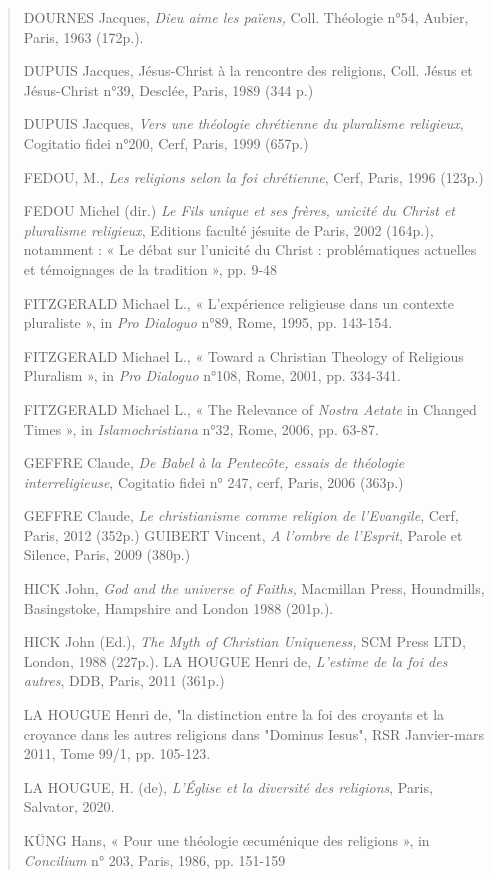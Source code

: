 \begin{quote}
DOURNES Jacques, \emph{Dieu aime les païens,} Coll. Théologie n°54,
Aubier, Paris, 1963 (172p.).

DUPUIS Jacques, Jésus-Christ à la rencontre des religions, Coll. Jésus
et Jésus-Christ n°39, Desclée, Paris, 1989 (344 p.)

DUPUIS Jacques, \emph{Vers une théologie chrétienne du pluralisme
religieux}, Cogitatio fidei n°200, Cerf, Paris, 1999 (657p.)

FEDOU, M., \emph{Les religions selon la foi chrétienne}, Cerf, Paris,
1996 (123p.)

FEDOU Michel (dir.) \emph{Le Fils unique et ses frères, unicité du
Christ et pluralisme religieux}, Editions faculté jésuite de Paris, 2002
(164p.), notamment : « Le débat sur l'unicité du Christ : problématiques
actuelles et témoignages de la tradition », pp. 9-48

FITZGERALD Michael L., « L'expérience religieuse dans un contexte
pluraliste », in \emph{Pro Dialoguo} n°89, Rome, 1995, pp. 143-154.

FITZGERALD Michael L., « Toward a Christian Theology of Religious
Pluralism », in \emph{Pro Dialoguo} n°108, Rome, 2001, pp. 334-341.

FITZGERALD Michael L., « The Relevance of \emph{Nostra Aetate} in
Changed Times », in \emph{Islamochristiana} n°32, Rome, 2006, pp. 63-87.

GEFFRE Claude, \emph{De Babel à la Pentecôte, essais de théologie
interreligieuse}, Cogitatio fidei n° 247, cerf, Paris, 2006 (363p.)

GEFFRE Claude, \emph{Le christianisme comme religion de l'Evangile},
Cerf, Paris, 2012 (352p.) GUIBERT Vincent, \emph{A l'ombre de l'Esprit},
Parole et Silence, Paris, 2009 (380p.)

HICK John, \emph{God and the universe of Faiths,} Macmillan Press,
Houndmills, Basingstoke, Hampshire and London 1988 (201p.).

HICK John (Ed.), \emph{The Myth of Christian Uniqueness,} SCM Press LTD,
London, 1988 (227p.). LA HOUGUE Henri de, \emph{L'estime de la foi des
autres}, DDB, Paris, 2011 (361p.)

LA HOUGUE Henri de, "la distinction entre la foi des croyants et la
croyance dans les autres religions dans "Dominus Iesus", RSR
Janvier-mars 2011, Tome 99/1, pp. 105-123.

LA HOUGUE, H. (de), \emph{L'Église et la diversité des religions},
Paris, Salvator, 2020.

KÜNG Hans, « Pour une théologie œcuménique des religions », in
\emph{Concilium} n° 203, Paris, 1986, pp. 151-159


\end{quote}
